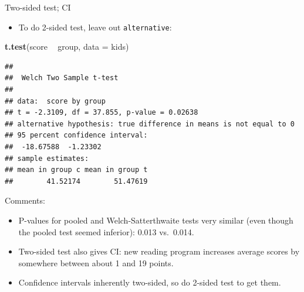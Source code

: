 \documentclass[ignorenonframetext,]{beamer}
\newenvironment{Shaded}{\begin{snugshade}}{\end{snugshade}}
\newcommand{\DataTypeTok}[1]{\textcolor[rgb]{0.13,0.29,0.53}{#1}}
\newcommand{\KeywordTok}[1]{\textcolor[rgb]{0.13,0.29,0.53}{\textbf{#1}}}
\newcommand{\NormalTok}[1]{#1}
\newcommand{\OperatorTok}[1]{\textcolor[rgb]{0.81,0.36,0.00}{\textbf{#1}}}
\newcommand{\StringTok}[1]{\textcolor[rgb]{0.31,0.60,0.02}{#1}}
\providecommand{\tightlist}{%
  \setlength{\itemsep}{0pt}\setlength{\parskip}{0pt}}
\begin{document}
\begin{frame}[fragile]{Two-sided test; CI}
\protect\hypertarget{two-sided-test-ci}{}

\begin{itemize}
\tightlist
\item
  To do 2-sided test, leave out \texttt{alternative}:
\end{itemize}

\begin{Shaded}
\begin{Highlighting}[]
\KeywordTok{t.test}\NormalTok{(score }\OperatorTok{~}\StringTok{ }\NormalTok{group, }\DataTypeTok{data =}\NormalTok{ kids)}
\end{Highlighting}
\end{Shaded}

\begin{verbatim}
## 
##  Welch Two Sample t-test
## 
## data:  score by group
## t = -2.3109, df = 37.855, p-value = 0.02638
## alternative hypothesis: true difference in means is not equal to 0
## 95 percent confidence interval:
##  -18.67588  -1.23302
## sample estimates:
## mean in group c mean in group t 
##        41.52174        51.47619
\end{verbatim}

\end{frame}

\begin{frame}{Comments:}
\protect\hypertarget{comments-2}{}

\begin{itemize}
\tightlist
\item
  P-values for pooled and Welch-Satterthwaite tests very similar (even
  though the pooled test seemed inferior): 0.013 vs.~0.014.
\item
  Two-sided test also gives CI: new reading program increases average
  scores by somewhere between about 1 and 19 points.
\item
  Confidence intervals inherently two-sided, so do 2-sided test to get
  them.
\end{itemize}

\end{frame}
\end{document}
